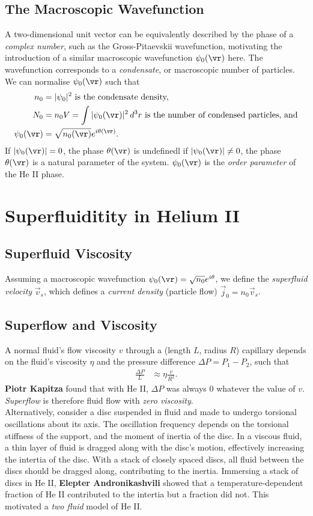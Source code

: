 \documentclass[qo.tex]{subfiles}
\begin{document}
\section{The Macroscopic Wavefunction}
A two-dimensional unit vector can be equivalently described by the phase of a \emph{complex number}, such as the Gross-Pitaevskii wavefunction, motivating the introduction of a similar macroscopic wavefunction $\psi_0(\vr)$ here. 
The wavefunction corresponds to a \emph{condensate}, or macroscopic number of particles. 
We can normalise $\psi_0(\vr)$ such that 
\begin{align}
    n_0 &= |\psi_0|^2 \text{ is the condensate density,} \\
    N_0 &= n_0V = \int |\psi_0(\vr)|^2\,d^3r \text{ is the number of condensed particles, and} \\
    \psi_0(\vr) &= \sqrt{n_0(\vr)}e^{i\theta(\vr)}.
\end{align}
If $|\psi_0(\vr)|=0$, the phase $\theta(\vr)$ is undefinedl if $|\psi_0(\vr)|\neq0$, the phase $\theta(\vr)$ is a natural parameter of the system. 
$\psi_0(\vr)$ is the \emph{order parameter} of the He II phase. 

\chapter{Superfluiditity in Helium II}
\section{Superfluid Viscosity}
Assuming a macroscopic wavefunction $\psi_0(\vr)=\sqrt{n_0}e^{i\theta}$, we define the \emph{superfluid velocity} $\vec{v}_s$, which defines a \emph{current density} (particle flow) $\vec{j}_0=n_0\vec{v}_s$.

\section{Superflow and Viscosity}
A normal fluid's flow viscosity $v$ through a (length $L$, radius $R$) capillary depends on the fluid's viscosity $\eta$ and the pressure difference $\Delta P = P_1-P_2$, such that
\begin{align}
    \frac{\Delta P}{L} &\approx \eta\frac{v}{R^2}.
\end{align}
\textbf{Piotr Kapitza} found that with He II, $\Delta P$ was always 0 whatever the value of $v$.
\emph{Superflow} is therefore fluid flow with \emph{zero viscosity}.\\
Alternatively, consider a disc suspended in fluid and made to undergo torsional oscillations about its axis. 
The oscillation frequency depends on the torsional stiffness of the support, and the moment of inertia of the disc. 
In a viscous fluid, a thin layer of fluid is dragged along with the disc's motion, effectively increasing the intertia of the disc. 
With a stack of closely spaced discs, all fluid between the discs should be dragged along, contributing to the inertia. 
Immersing a stack of discs in He II, \textbf{Elepter Andronikashvili} showed that a temperature-dependent fraction of He II contributed to the intertia but a fraction did not. 
This motivated a \emph{two fluid} model of He II.
\end{document}
